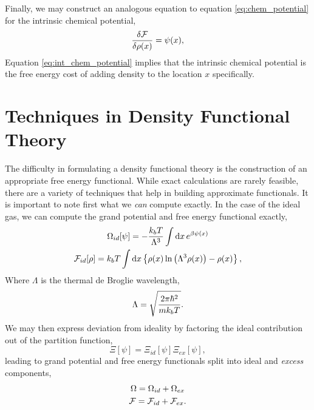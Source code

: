 Finally, we may construct an analogous equation to equation
\ref{eq:chem_potential} for the intrinsic chemical potential,
%
\begin{equation}
    \label{eq:int_chem_potential} 
    \frac{\delta \mathcal{F}}{\delta \rho(x)} = \psi(x),
\end{equation}
%
 Equation \ref{eq:int_chem_potential} implies that the intrinsic chemical
potential is the free energy cost of adding density to the location $x$
specifically. 

\section{Techniques in Density Functional Theory} %

The difficulty in formulating a density functional theory is the construction
of an appropriate free energy functional.  While exact calculations are rarely
feasible, there are a variety of techniques that help in building approximate
functionals.  It is important to note first what we \textit{can} compute exactly.
In the case of the ideal gas, we can compute the grand potential and free
energy functional exactly,
%
\begin{gather}
    \Omega_{id}[\psi] = -\frac{k_bT}{\Lambda^{3}} 
        \int\mathrm{d}x\,e^{\beta\psi(x)} \\ 
    \mathcal{F}_{id}[\rho] = k_bT\int \mathrm{d}x
        \left\lbrace \rho(x) \ln\left(\Lambda^3\rho(x)\right) - \rho(x) \right\rbrace,
    \label{F_ideal}
\end{gather}
% 
Where $\Lambda$ is the thermal de Broglie wavelength,
%
\begin{equation}
    \Lambda = \sqrt{\frac{2 \pi \hbar^2}{m k_b T}}.
\end{equation}
%
We may then express deviation from ideality by factoring the ideal contribution
out of the partition function,
%
\begin{equation}
    \Xi[\psi] = \Xi_{id}[\psi]\Xi_{ex}[\psi],
\end{equation}
%
leading to grand potential and free energy functionals split into ideal and
\textit{excess} components,
%
\begin{gather}
    \Omega = \Omega_{id} + \Omega_{ex} \\
    \mathcal{F} = \mathcal{F}_{id} + \mathcal{F}_{ex}.
\end{gather}

